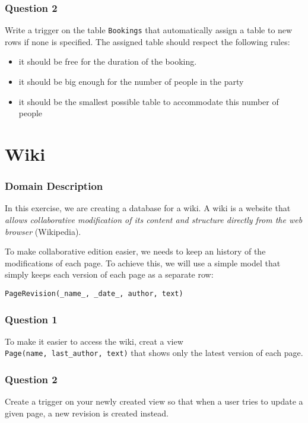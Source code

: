 \documentclass{beamer}
\begin{document}
\begin{frame}
  \frametitle{Question 2}
  Write a trigger on the table \texttt{Bookings} that automatically assign a
  table to new rows if none is specified. The assigned table should respect the
  following rules:
  \begin{itemize}
    \item it should be free for the duration of the booking.
    \item it should be big enough for the number of people in the party
    \item it should be the smallest possible table to accommodate this number
      of people
  \end{itemize}
\end{frame}


\section{Wiki}\label{exercise-3-wiki}
\frame{\sectionpage}

\begin{frame}[fragile]
  \frametitle{Domain Description}
  In this exercise, we are creating a database for a wiki. A wiki is a website
  that \emph{allows collaborative modification of its content and structure
  directly from the web browser} (Wikipedia).

  To make collaborative edition easier, we needs to keep an history of the
  modifications of each page. To achieve this, we will use a simple model
  that simply keeps each version of each page as a separate row:

\begin{verbatim}
PageRevision(_name_, _date_, author, text)
\end{verbatim}
\end{frame}

\begin{frame}
  \frametitle{Question 1}
  To make it easier to access the wiki, creat a view \texttt{Page(name,\
  last\_author,\ text)} that shows only the latest version of each page.
\end{frame}

\begin{frame}
  \frametitle{Question 2}
Create a trigger on your newly created view so that
when a user tries to update a given page, a new revision is created
instead.
\end{frame}
\end{document}
